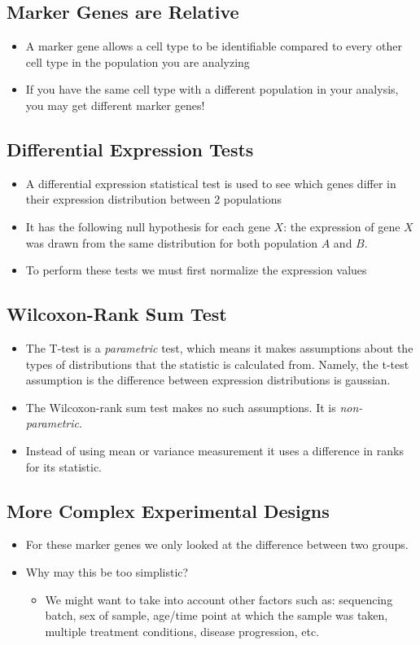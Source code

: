 \documentclass[10pt]{article}
\begin{document}
\subsection*{Marker Genes are Relative}
\begin{itemize}
	\item A marker gene allows a cell type to be identifiable compared to every other cell type in the population you are analyzing
	\item If you have the same cell type with a different population in your analysis, you may get different marker genes!
\end{itemize}

\subsection*{Differential Expression Tests}
\begin{itemize}
	\item A differential expression statistical test is used to see which genes differ in their expression distribution between 2 populations
	\item It has the following null hypothesis for each gene $X$: the expression of gene $X$ was drawn from the same distribution for both population $A$ and $B$.
	\item To perform these tests we must first normalize the expression values
\end{itemize}

\subsection*{Wilcoxon-Rank Sum Test}
\begin{itemize}
	\item The T-test is a \textit{parametric} test, which means it makes assumptions about the types of distributions that the statistic is calculated from.  Namely, the t-test assumption is the difference between expression distributions is gaussian.
	\item The Wilcoxon-rank sum test makes no such assumptions.  It is \textit{non-parametric}.
	\item Instead of using mean or variance measurement it uses a difference in ranks for its statistic.
\end{itemize}

\subsection*{More Complex Experimental Designs}
\begin{itemize}
	\item For these marker genes we only looked at the difference between two groups.
	\item Why may this be too simplistic?
	\begin{itemize}
	    \item We might want to take into account other factors such as: sequencing batch, sex of sample, age/time point at which the sample was taken, multiple treatment conditions, disease progression, etc.
    \end{itemize}
\end{itemize}
\end{document}
